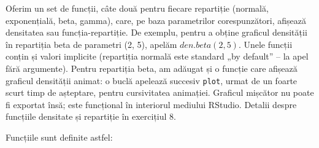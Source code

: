 \documentclass[12pt]{article}
\begin{document}
Oferim un set de funcții, câte două pentru fiecare repartiție (normală, exponențială, beta, gamma), care, pe baza parametrilor corespunzători, afișează densitatea sau funcția-repartiție. De exemplu, pentru a obține graficul densității în repartiția beta de parametri (2, 5), apelăm $den.beta(2, 5)$. Unele funcții conțin și valori implicite (repartiția normală este standard „by default” – la apel fără argumente).
Pentru repartiția beta, am adăugat și o funcție care afișează graficul densității animat: o buclă apelează succesiv \lstinline|plot|, urmat de un foarte scurt timp de așteptare, pentru cursivitatea animației. Graficul mișcător nu poate fi exportat însă; este funcțional în interiorul mediului RStudio. Detalii despre funcțiile densitate și repartiție în exercițiul 8. \\ \par
Funcțiile sunt definite astfel: \\
\end{document}
